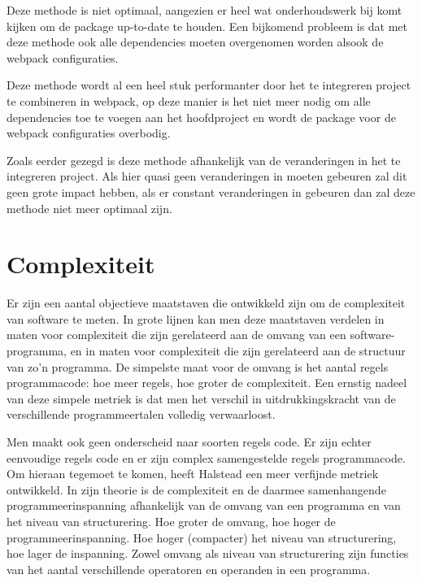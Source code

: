 Deze methode is niet optimaal, aangezien er heel wat onderhoudswerk bij komt kijken om de package up-to-date te houden. Een bijkomend probleem is dat met deze methode ook alle dependencies moeten overgenomen worden alsook de webpack configuraties. 

Deze methode wordt al een heel stuk performanter door het te integreren project te combineren in webpack, op deze manier is het niet meer nodig om alle dependencies toe te voegen aan het hoofdproject en wordt de package voor de webpack configuraties overbodig. 

Zoals eerder gezegd is deze methode afhankelijk van de veranderingen in het te integreren project. Als hier quasi geen veranderingen in moeten gebeuren zal dit geen grote impact hebben, als er constant veranderingen in gebeuren dan zal deze methode niet meer optimaal zijn. 

\section{Complexiteit}
Er zijn een aantal objectieve maatstaven die ontwikkeld zijn om de complexiteit van software te meten. In grote lijnen kan men deze maatstaven verdelen in maten voor complexiteit die zijn gerelateerd aan de omvang van een software-programma, en in maten voor complexiteit die zijn gerelateerd aan de structuur van zo'n programma. De simpelste maat voor de omvang is het aantal regels programmacode: hoe meer regels, hoe groter de complexiteit. Een ernstig nadeel van deze simpele metriek is dat men het verschil in uitdrukkingskracht van de verschillende programmeertalen volledig verwaarloost.

Men maakt ook geen onderscheid naar soorten regels code. Er zijn echter eenvoudige regels code en er zijn complex samengestelde regels programmacode. Om hieraan tegemoet te komen, heeft Halstead een meer verfijnde metriek ontwikkeld. In zijn theorie is de complexiteit en de daarmee samenhangende programmeerinspanning afhankelijk van de omvang van een programma en van het niveau van structurering. Hoe groter de omvang, hoe hoger de programmeerinspanning. Hoe hoger (compacter) het niveau van structurering, hoe lager de inspanning. Zowel omvang als niveau van structurering zijn functies van het aantal verschillende operatoren en operanden in een programma.
\autocite{complexiteit01}





